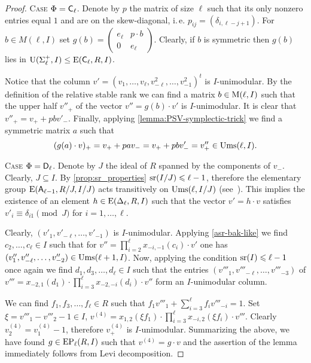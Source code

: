 \begin{proof} 
\textsc{Case $\Phi=\mathsf{C}_\ell$.}
Denote by $p$ the matrix of size $\ell$ such that its only nonzero entries equal $1$ and are on the skew-diagonal, i.\,e. $p_{ij}=(\delta_{i, \ell-j+1})$. 
For $b \in M(\ell, I)$ set $g(b)=\left(\begin{smallmatrix} e_\ell & p \cdot b \\ 0 & e_{\ell} \end{smallmatrix}\right)$.
Clearly, if $b$ is symmetric then $g(b)$ lies in $\operatorname{U}(\Sigma_\ell^+, I)\leq \operatorname{E}(\mathsf{C}_\ell, R, I)$.

Notice that the column $v'=(v_1,\ldots,v_\ell, v_{-\ell}^2,\ldots,v_{-1}^2)^t$ is $I$-unimodular.
By the definition of the relative stable rank we can find a matrix $b\in \operatorname{M}(\ell,I)$ such that the upper half $v''_+$ of the vector $v''= g(b) \cdot v'$ is $I$-unimodular.
It is clear that $v''_+ = v_+ + pb v'_-$. 
Finally, applying \cref{lemma:PSV-symplectic-trick} we find a symmetric matrix $a$ such that
$$(g(a)\cdot v)_+=v_+ + pav_- = v_+ + pbv'_- = v''_+ \in \operatorname{Ums}(\ell, I).$$

\textsc{Case $\Phi=\mathsf{D}_\ell$.} Denote by $J$ the ideal of $R$ spanned by the components of $v_{-}$. Clearly, $J \subseteq I$.
By \cref{prop:sr_properties} $\operatorname{sr}(I/J) \leqslant \ell-1$, therefore
the elementary group $\operatorname{E}(\mathsf{A}_{\ell-1}, R/J, I/J)$ acts transitively on $\operatorname{Ums}(\ell, I/J)$ (see~\cite[Theorem~2.3c]{Va69}). 
This implies the existence of an element $h\in \operatorname{E}(\Delta_\ell, R, I)$ such that the vector $v' = h \cdot v$ satisfies $v'_i \equiv \delta_{i1} \pmod J$ for $i=1,\ldots, \ell$.

Clearly, $(v'_1,v'_{-\ell},\ldots, v'_{-1})$ is $I$-unimodular.
Applying \cref{asr-bak-like} we find $c_2,\ldots, c_\ell\in I$ such that for $v''= \prod_{i=2}^{\ell}x_{-i, -1}(c_i)\cdot v'$ one has
$(v''_1, v''_{-\ell},\ldots, v''_{-2})\in\operatorname{Ums}(\ell+1, I)$.
Now, applying the condition $\operatorname{sr}(I) \leqslant \ell-1$ once again we find
$d_1,d_3,\ldots, d_{\ell}\in I$ such that the entries $(v'''_1, v'''_{-\ell},\ldots, v'''_{-3})$
of $v'''=x_{-2,1}(d_1) \cdot \prod_{i=3}^{\ell} x_{-2,-i}(d_i) \cdot v''$ form an $I$-unimodular column.

We can find $f_1, f_3,\ldots, f_\ell \in R$ such that $f_1v'''_1+\sum_{i=3}^\ell f_i v'''_{-i} = 1$.
Set $\xi = v'''_1-v'''_2-1 \in I$, $v^{(4)}=x_{1,2}(\xi f_1) \cdot \prod_{i=3}^\ell x_{-i,2}(\xi f_i) \cdot v'''$.
Clearly $v^{(4)}_2 = v^{(4)}_1-1$, therefore $v^{(4)}_+$ is $I$-unimodular.
Summarizing the above, we have found $g\in \operatorname{EP}_\ell(R, I)$ such that $v^{(4)}=g \cdot v$
and the assertion of the lemma immediately follows from Levi decomposition. \end{proof}

